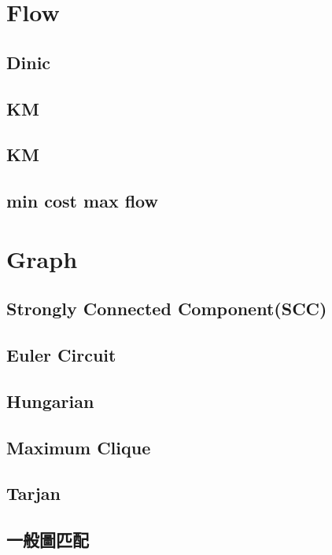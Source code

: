 \section{Flow}

\subsection{Dinic}

\subsection{KM}

\subsection{KM}

\subsection{min cost max flow}


\section{Graph}

\subsection{Strongly Connected Component(SCC)}

\subsection{Euler Circuit}

\subsection{Hungarian}

\subsection{Maximum Clique}

\subsection{Tarjan}

\subsection{一般圖匹配}



